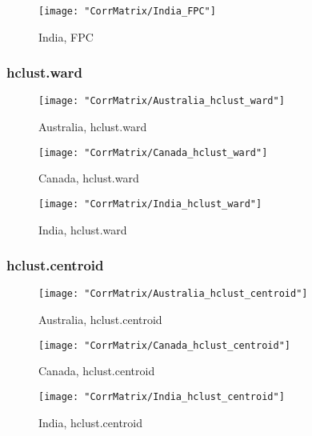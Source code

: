 \documentclass[a4paper]{article}
\begin{document}
\begin{figure}[H]
\begin{center}
\texttt{[image: "CorrMatrix/India\_FPC"]}
\caption{India,  FPC}
\label{fig:2}
\end{center}
\end{figure}

\subsubsection{hclust.ward}

\begin{figure}[H]
\begin{center}
\texttt{[image: "CorrMatrix/Australia\_hclust\_ward"]}
\caption{Australia,  hclust.ward}
\label{fig:2}
\end{center}
\end{figure}

\begin{figure}[H]
\begin{center}
\texttt{[image: "CorrMatrix/Canada\_hclust\_ward"]}
\caption{Canada,  hclust.ward}
\label{fig:2}
\end{center}
\end{figure}

\begin{figure}[H]
\begin{center}
\texttt{[image: "CorrMatrix/India\_hclust\_ward"]}
\caption{India,  hclust.ward}
\label{fig:2}
\end{center}
\end{figure}

\subsubsection{hclust.centroid}

\begin{figure}[H]
\begin{center}
\texttt{[image: "CorrMatrix/Australia\_hclust\_centroid"]}
\caption{Australia,  hclust.centroid}
\label{fig:2}
\end{center}
\end{figure}

\begin{figure}[H]
\begin{center}
\texttt{[image: "CorrMatrix/Canada\_hclust\_centroid"]}
\caption{Canada,  hclust.centroid}
\label{fig:2}
\end{center}
\end{figure}

\begin{figure}[H]
\begin{center}
\texttt{[image: "CorrMatrix/India\_hclust\_centroid"]}
\caption{India,  hclust.centroid}
\label{fig:2}
\end{center}
\end{figure}
\end{document}
